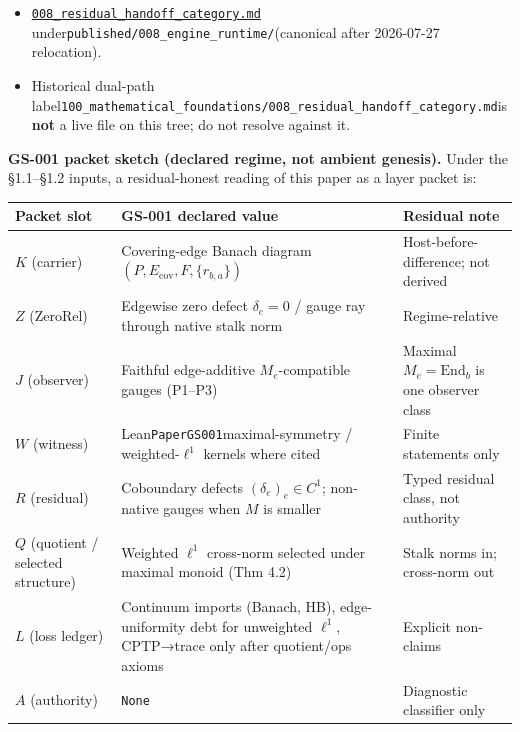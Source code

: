 \documentclass[
  11pt,
]{article}
\providecommand{\tightlist}{%
  \setlength{\itemsep}{0pt}\setlength{\parskip}{0pt}}
\providecommand{\tightlist}{%
  \setlength{\itemsep}{0pt}\setlength{\parskip}{0pt}}
\begin{document}
\begin{itemize}
\tightlist
\item
  \href{../../008_engine_runtime/008_residual_handoff_category.md}{\texttt{008\_residual\_handoff\_category.md}} under\texttt{published/008\_engine\_runtime/}(canonical after 2026-07-27 relocation).
\item
  Historical dual-path label\texttt{100\_mathematical\_foundations/008\_residual\_handoff\_category.md}is \textbf{not} a live file on this tree; do not resolve against it.
\end{itemize}

\textbf{GS-001 packet sketch (declared regime, not ambient genesis).} Under the §1.1--§1.2 inputs, a residual-honest reading of this paper as a layer packet is:

\begin{longtable}[]{@{}
  >{\raggedright\arraybackslash}p{}
  >{\raggedright\arraybackslash}p{}
  >{\raggedright\arraybackslash}p{}@{}}
\toprule\noalign{}
\begin{minipage}[b]{\linewidth}\raggedright
Packet slot
\end{minipage} & \begin{minipage}[b]{\linewidth}\raggedright
GS-001 declared value
\end{minipage} & \begin{minipage}[b]{\linewidth}\raggedright
Residual note
\end{minipage} \\
\midrule\noalign{}
\endhead
\bottomrule\noalign{}
\endlastfoot
\(K\) (carrier) & Covering-edge Banach diagram \((P,E_{\mathrm{cov}},F,\{r_{b,a}\})\) & Host-before-difference; not derived \\
\(Z\) (ZeroRel) & Edgewise zero defect \(\delta_e=0\) / gauge ray through native stalk norm & Regime-relative \\
\(J\) (observer) & Faithful edge-additive \(M_e\)-compatible gauges (P1--P3) & Maximal \(M_e=\mathrm{End}_b\) is one observer class \\
\(W\) (witness) & Lean\texttt{PaperGS001}maximal-symmetry / weighted-\(\ell^1\) kernels where cited & Finite statements only \\
\(R\) (residual) & Coboundary defects \((\delta_e)_e\in C^1\); non-native gauges when \(M\) is smaller & Typed residual class, not authority \\
\(Q\) (quotient / selected structure) & Weighted \(\ell^1\) cross-norm selected under maximal monoid (Thm 4.2) & Stalk norms in; cross-norm out \\
\(L\) (loss ledger) & Continuum imports (Banach, HB), edge-uniformity debt for unweighted \(\ell^1\), CPTP→trace only after quotient/ops axioms & Explicit non-claims \\
\(A\) (authority) & \texttt{None} & Diagnostic classifier only \\
\end{longtable}
\end{document}
